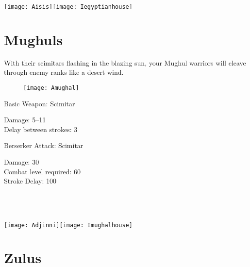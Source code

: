 \begin{center}
	\texttt{[image: Aisis]}\hspace{1pt}\texttt{[image: Iegyptianhouse]}
\end{center}

\clearpage

\section{Mughuls}


With their scimitars flashing in the blazing sun, your Mughul warriors will cleave through enemy ranks like a desert wind.

\begin{wrapfigure}{r}{0.5\textwidth}
	\begin{center}
		\vspace{-20pt}
		\texttt{[image: Amughal]}
	\end{center}
	\vspace{-20pt}
\end{wrapfigure}

Basic Weapon: Scimitar
\begin{adjustwidth}{1cm}{}
	Damage: 5–11 \\
	Delay between strokes: 3
\end{adjustwidth}
Berserker Attack: Scimitar
\begin{adjustwidth}{1cm}{}
	Damage: 30 \\
	Combat level required: 60 \\
	Stroke Delay: 100 \\ \\ \\ \\
\end{adjustwidth}

\begin{center}
	\texttt{[image: Adjinni]}\hspace{1pt}\texttt{[image: Imughalhouse]}
\end{center}

\clearpage

\section{Zulus}


